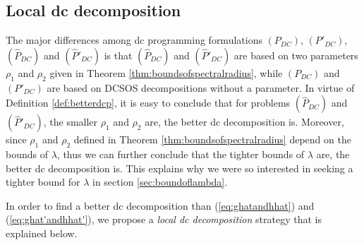 \documentclass[3p]{elsarticle}
\begin{document}
\subsection{Local dc decomposition}\label{subsec:localdcdecomp}
The major differences among dc programming formulations $(P_{DC})$, $(P'_{DC})$, $(\hat{P}_{DC})$ and $(\hat{P}'_{DC})$ is that $(\hat{P}_{DC})$ and $(\hat{P}'_{DC})$ are based on two parameters $\rho_1$ and $\rho_2$ given in Theorem \ref{thm:boundsofspectralradius}, while $(P_{DC})$ and $(P'_{DC})$ are based on DCSOS decompositions without a parameter. In virtue of Definition \ref{def:betterdcp}, it is easy to conclude that for problems $(\hat{P}_{DC})$ and $(\hat{P}'_{DC})$, the smaller $\rho_1$ and $\rho_2$ are, the better dc decomposition is. Moreover, since $\rho_1$ and $\rho_2$ defined in Theorem \ref{thm:boundsofspectralradius} depend on the bounds of $\lambda$, thus we can further conclude that the tighter bounds of $\lambda$ are, the better dc decomposition is. This explains why we were so interested in seeking a tighter bound for $\lambda$ in section \ref{sec:boundoflambda}.

In order to find a better dc decomposition than (\ref{eq:ghatandhhat}) and (\ref{eq:ghat'andhhat'}), we propose a \emph{local dc decomposition} strategy that is explained below.
\end{document}
